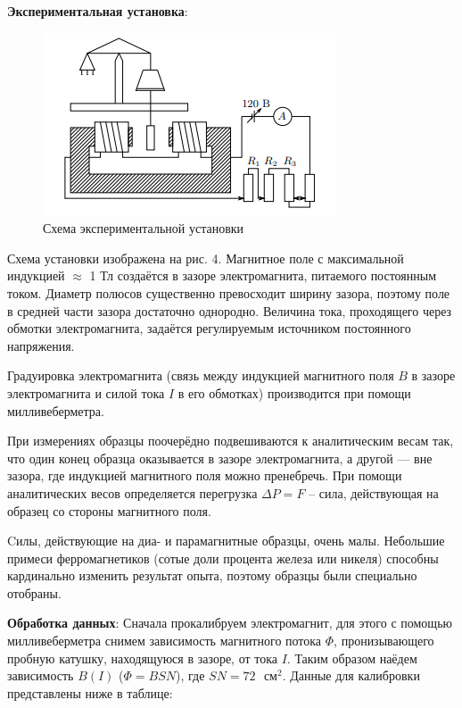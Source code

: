 \documentclass[a4paper,12pt]{article}
\begin{document}
\textbf{Экспериментальная установка}:
\begin{figure}[H]\label{fig: ustanovka}
    \centering
    \includegraphics[width = 0.7 \textwidth]{Установка.png}
    \caption{Схема экспериментальной установки}
\end{figure}

Схема установки изображена на рис. 4. Магнитное поле с максимальной индукцией $\approx$ 1 Тл создаётся в зазоре электромагнита, питаемого
постоянным током. Диаметр полюсов существенно превосходит ширину зазора, поэтому поле в средней части зазора достаточно однородно. Величина тока, проходящего через обмотки электромагнита, задаётся регулируемым источником постоянного напряжения.

Градуировка электромагнита (связь между индукцией магнитного поля $B$ в зазоре электромагнита и силой тока $I$ в его обмотках) производится при помощи милливеберметра.

При измерениях образцы поочерёдно подвешиваются к аналитическим весам так, что один конец образца оказывается в зазоре электромагнита, а другой — вне зазора, где индукцией магнитного поля можно пренебречь. При помощи аналитических весов определяется перегрузка  $\Delta P = F$ -- сила, действующая на образец со стороны магнитного поля.

Cилы, действующие на диа- и парамагнитные
образцы, очень малы. Небольшие примеси ферромагнетиков (сотые доли процента железа или никеля) способны кардинально изменить результат
опыта, поэтому образцы были специально отобраны.


\textbf{Обработка данных}:  Сначала прокалибруем электромагнит, для этого  с помощью милливеберметра снимем зависимость магнитного потока $\Phi$,  пронизывающего пробную катушку, находящуюся в зазоре, от тока $I$. Таким образом наёдем зависимость $B(I)$ ($\Phi = B S N$), где $SN = 72 \text{ } см^2$. Данные для калибровки представлены ниже в таблице:
\end{document}
